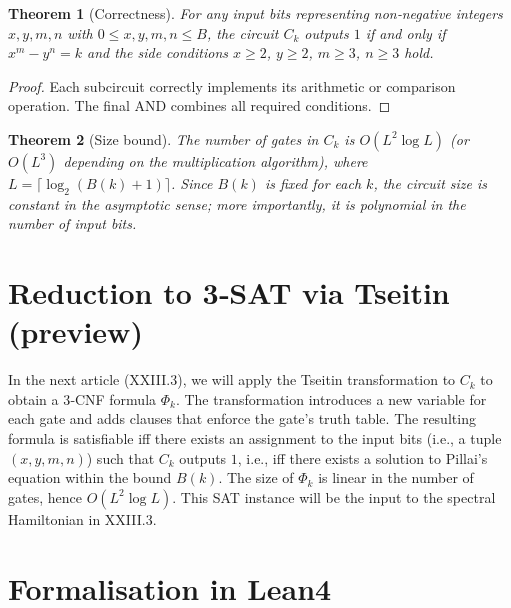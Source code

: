 \documentclass[11pt,a4paper]{article}
\newtheorem{theorem}{Theorem}[section]
\begin{document}
\begin{theorem}[Correctness]
\label{thm:correct}
For any input bits representing non‑negative integers $x,y,m,n$ with $0 \le x,y,m,n \le B$, the circuit $C_k$ outputs $1$ if and only if $x^m - y^n = k$ and the side conditions $x\ge2$, $y\ge2$, $m\ge3$, $n\ge3$ hold.
\end{theorem}
\begin{proof}
Each subcircuit correctly implements its arithmetic or comparison operation. The final AND combines all required conditions.
\end{proof}

\begin{theorem}[Size bound]
\label{thm:size}
The number of gates in $C_k$ is $O(L^2 \log L)$ (or $O(L^3)$ depending on the multiplication algorithm), where $L = \lceil \log_2(B(k)+1)\rceil$. Since $B(k)$ is fixed for each $k$, the circuit size is constant in the asymptotic sense; more importantly, it is polynomial in the number of input bits.
\end{theorem}

\section{Reduction to 3‑SAT via Tseitin (preview)}

In the next article (XXIII.3), we will apply the Tseitin transformation to $C_k$ to obtain a 3‑CNF formula $\Phi_k$. The transformation introduces a new variable for each gate and adds clauses that enforce the gate’s truth table. The resulting formula is satisfiable iff there exists an assignment to the input bits (i.e., a tuple $(x,y,m,n)$) such that $C_k$ outputs $1$, i.e., iff there exists a solution to Pillai's equation within the bound $B(k)$. The size of $\Phi_k$ is linear in the number of gates, hence $O(L^2 \log L)$. This SAT instance will be the input to the spectral Hamiltonian in XXIII.3.

\section{Formalisation in Lean4}
\end{document}
